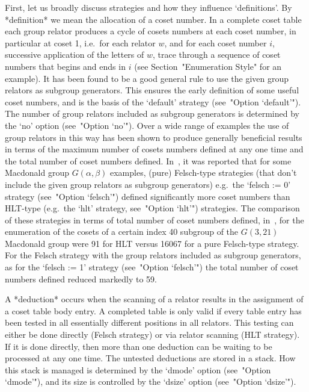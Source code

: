 First, let us  broadly  discuss  strategies  and  how  they  influence
\lq{}definitions'.  By  *definition*  we  mean   the
allocation of a coset number. In a complete  coset  table  each  group
relator produces a cycle of cosets numbers at each  coset  number,  in
particular at coset 1, i.e.~for each relator $w$, and for  each  coset
number $i$, successive  application  of  the  letters  of  $w$,  trace
through a sequence of coset numbers that begins and ends in  $i$  (see
Section~"Enumeration Style" for an example). It has been found to be a
good general  rule  to  use  the  given  group  relators  as  subgroup
generators. This ensures the early definition  of  some  useful  coset
numbers, and is the  basis  of  the  `default'  strategy  (see~"Option
`default'").  The  number  of  group  relators  included  as  subgroup
generators is determined by the `no' option (see~"Option `no'").  Over
a wide range of examples the use of group relators  in  this  way  has
been shown to produce generally beneficial results  in  terms  of  the
maximum number of cosets numbers defined at any one time and the total
number of coset numbers defined.  In~\cite{CDHW73},  it  was  reported
that for  some  Macdonald  group  $G(\alpha,\beta)$  examples,  (pure)
Felsch-type strategies (that don't include the given group relators as
subgroup generators) e.g.~the  `felsch  :=  0'  strategy  (see~"Option
`felsch'") defined significantly  more  coset  numbers  than  HLT-type
(e.g.~the  `hlt'  strategy,  see~"Option   `hlt'")   strategies.   The
comparison of these strategies in  terms  of  total  number  of  coset
numbers defined, in~\cite{Hav91}, for the enumeration of the cosets of
a certain index 40 subgroup of the $G(3,21)$ Macdonald group  were  91
for HLT versus 16067 for a pure Felsch-type strategy. For  the  Felsch
strategy with the group relators included as subgroup  generators,  as
for the `felsch :=  1'  strategy  (see~"Option  `felsch'")  the  total
number of coset numbers defined reduced markedly to 59.

A *deduction* occurs when the scanning of  a  relator
results in the assignment of a coset table  body  entry.  A  completed
table is only valid if every  table  entry  has  been  tested  in  all
essentially different positions in  all  relators.  This  testing  can
either be done directly (Felsch strategy) or via relator scanning (HLT
strategy). If it is done directly, then more than one deduction can be
waiting to be processed at any one time. The untested  deductions  are
stored in a stack. How this stack is  managed  is  determined  by  the
`dmode' option (see~"Option `dmode'"), and its size is  controlled  by
the `dsize' option (see~"Option `dsize'").

